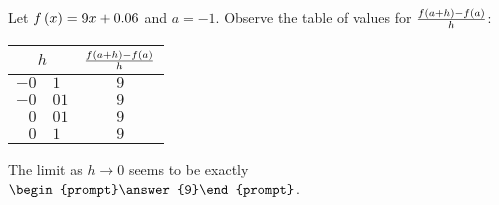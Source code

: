 \documentclass{ximera}
\author{Gregory Hartman \and Matthew Carr}
\begin{document}
\begin{exercise}







Let $f\left(x\right) = 9x+0.06$ and $a=-1$. Observe the table of values for $\frac{f\left(a+h\right)-f\left(a\right)}{h}$:
\begin{center}
 \begin{tabular}{r@{.}lc}
  \multicolumn{2}{c}{$h$} & $\frac{f\left(a+h\right)-f\left(a\right)}{h}$\\ \hline 
  $-0$ & $1$ & $9$ \\
  $-0$ & $01$ & $9$ \\
  $0$ & $01$ & $9$ \\
  $0$ & $1$ & $9$
 \end{tabular}
\end{center}
The limit as $h\to 0$ seems to be exactly $\begin{prompt}\answer{9}\end{prompt}$.

\end{exercise}
\end{document}
